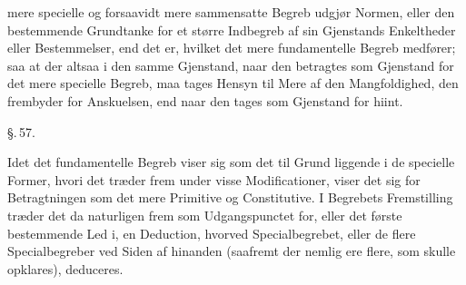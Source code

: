 \documentclass[12pt]{book}
\def\textit#1{#1}%
\newcommand{\parag}[1]{%
  \par\vspace{0.9\baselineskip}%
  {\centering\textit{\S.\,#1.}\par}%
  \vspace{0.35\baselineskip}%
  \noindent\hspace{\parindent}\ignorespaces
}
\newcommand{\opage}[1]{\marginnote{\footnotesize\textit{[#1]}}}
\begin{document}
mere specielle og forsaavidt mere sammensatte Begreb udgjør Normen, eller den
bestemmende Grundtanke for et større Indbegreb af sin Gjenstands Enkeltheder eller
Bestemmelser, end det er, hvilket det mere fundamentelle Begreb medfører; saa at der
altsaa i den samme Gjenstand, naar den betragtes som Gjenstand for det mere specielle
Begreb, maa tages Hensyn til Mere af den Mangfoldighed, den frembyder for Anskuelsen,
end naar den tages som Gjenstand for hiint.
\opage{140} \parag{57}

Idet det fundamentelle Begreb viser sig som det til Grund liggende i de specielle
Former, hvori det træder frem under visse Modificationer, viser det sig for
Betragtningen som det mere \textit{Primitive} og \textit{Constitutive}. I Begrebets
Fremstilling træder det da naturligen frem som Udgangspunctet for, eller det første
bestemmende Led i, en Deduction, hvorved Specialbegrebet, eller de flere
Specialbegreber ved Siden af hinanden (saafremt der nemlig ere flere, som skulle
opklares), deduceres.
\end{document}
